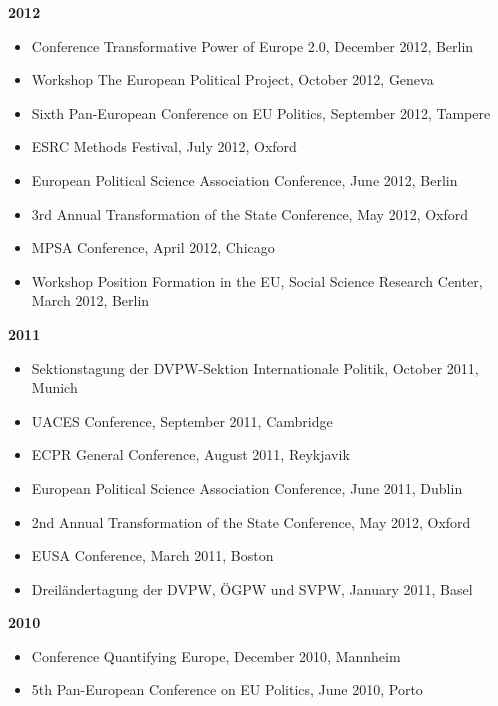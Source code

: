 \textbf{2012}
\begin{itemize}[topsep=0pt, noitemsep, leftmargin=3]
	\item Conference Transformative Power of Europe 2.0, December 2012, Berlin
	\item Workshop The European Political Project, October 2012, Geneva
	\item Sixth Pan-European Conference on EU Politics, September 2012, Tampere
	\item ESRC Methods Festival, July 2012, Oxford
	\item  European Political Science Association Conference, June 2012, Berlin
	\item 3rd Annual Transformation of the State Conference, May 2012, Oxford 
	\item MPSA Conference, April 2012, Chicago
	\item Workshop Position Formation in the EU, Social Science Research Center, March 2012, Berlin
\end{itemize}

\vspace{\baselineskip}

\textbf{2011}
\begin{itemize}[topsep=0pt, noitemsep, leftmargin=3]
	\item  Sektionstagung der DVPW-Sektion Internationale Politik, October 2011, Munich
	\item UACES Conference, September 2011, Cambridge
	\item ECPR General Conference, August 2011, Reykjavik
	\item European Political Science Association Conference, June 2011, Dublin
	\item 2nd Annual Transformation of the State Conference, May 2012, Oxford
	\item EUSA Conference, March 2011, Boston
	\item Dreiländertagung der DVPW, ÖGPW und SVPW, January 2011, Basel
\end{itemize}

\vspace{\baselineskip}

\textbf{2010}
\begin{itemize}[topsep=0pt, noitemsep, leftmargin=3]
	\item Conference Quantifying Europe, December 2010, Mannheim
	\item 5th Pan-European Conference on EU Politics, June 2010, Porto
\end{itemize}

